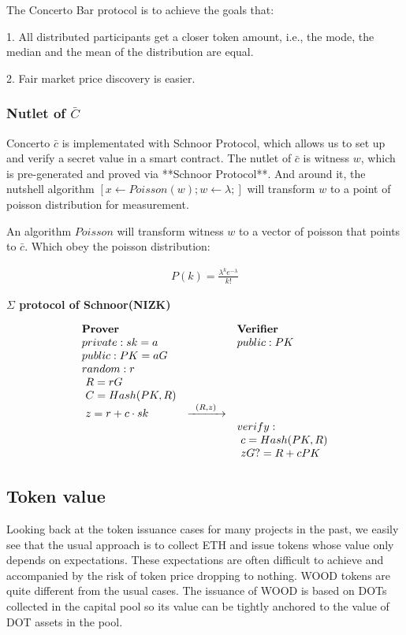 \documentclass[UTF8]{article}
\begin{document}
\begin{multicols}{2}
The Concerto Bar protocol is to achieve the goals that:

1. All distributed participants get a closer token amount, i.e., the mode, the median and the mean of the distribution are equal.

2. Fair market price discovery is easier.

\subsubsection{Nutlet of $\bar{C}$}
Concerto $\bar{c}$ is implementated with Schnoor Protocol\cite{schnoor}, which allows us to set up and verify a secret value in a smart contract. The nutlet of $\bar{c}$ is witness $w$, which is pre-generated and proved via **Schnoor Protocol**. And around it, the nutshell algorithm $[x \leftarrow Poisson(w);w\leftarrow \lambda;]$ will transform $w$ to a point of poisson distribution for measurement.



An algorithm $Poisson$ will transform witness $w$ to a vector of poisson that points to $\bar{c}$. Which obey the poisson distribution:

\begin{eqnarray*}
  P(k) = \frac{\lambda^k e^{-\lambda}}{k!}
\end{eqnarray*}

\textbf{$\Sigma$ protocol of Schnoor(NIZK)}

\[
\begin{array}{l l l}
  \text{\textbf{Prover}} & & \text{\textbf{Verifier}} \\
  private: sk=a & & public: PK  \\
  public: PK=aG & & \\
  random: r \\
  \ R = rG \\
  \ C=Hash(PK, R)\\
  \ z = r + c\cdot sk
                         & \xrightarrow{\hspace{0.5em}(R, z)\hspace{0.5em}} &\\

                         & & verify:\\
  & & \ c=Hash(PK, R)\\
                         & & \ zG ?= R + cPK
\end{array}
\]



\subsection{Token value}
Looking back at the token issuance cases for many projects in the past, we easily see that the usual approach is to collect ETH and issue tokens whose value only depends on expectations. These expectations are often difficult to achieve and accompanied by the risk of token price dropping to nothing. WOOD tokens are quite different from the usual cases. The issuance of WOOD is based on DOTs collected in the capital pool so its value can be tightly anchored to the value of DOT assets in the pool.


\end{multicols}
\end{document}
